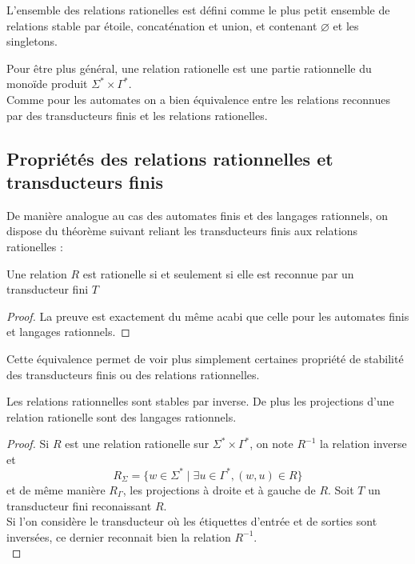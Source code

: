 \documentclass{scrartcl}
\begin{document}
\begin{flushleft}
\begin{define}
    L'ensemble des relations rationelles est défini comme le plus petit ensemble de relations stable par étoile,
    concaténation et union, et contenant $\varnothing$ et les singletons.
\end{define}

Pour être plus général, une relation rationelle est une partie rationnelle du monoïde produit
$\Sigma^* \times \Gamma^*$.\\
Comme pour les automates on a bien équivalence entre les relations reconnues par des transducteurs finis
et les relations rationelles.

\subsection{Propriétés des relations rationnelles et transducteurs finis}

De manière analogue au cas des automates finis et des langages rationnels, on dispose du théorème suivant reliant
les transducteurs finis aux relations rationelles :

\begin{theorem}
    Une relation $R$ est rationelle si et seulement si elle est reconnue par un transducteur fini $T$
\end{theorem}

\begin{proof}
    La preuve est exactement du même acabi que celle pour les automates finis et langages rationnels.
\end{proof}

Cette équivalence permet de voir plus simplement certaines propriété de stabilité des transducteurs finis ou des relations
rationnelles.
\begin{prop} \label{stabRat}
    Les relations rationnelles sont stables par inverse. De plus les projections d'une relation
    rationelle sont des langages rationnels.
\end{prop}

\begin{proof}
    Si $R$ est une relation rationelle sur $\Sigma^* \times \Gamma^*$, on note $R^{-1}$ la relation inverse et
    \[ R_{\Sigma} = \{ w \in \Sigma^* \mid \exists u \in \Gamma^*, (w, u) \in R \} \]
    et de même manière $R_{\Gamma}$, les projections à droite et à gauche de $R$. Soit $T$ un transducteur fini reconaissant $R$.\\
    Si l'on considère le transducteur où les étiquettes d'entrée et de sorties sont inversées, ce dernier reconnait bien la
    relation $R^{-1}$.\\
\end{proof}


\end{flushleft}
\end{document}
